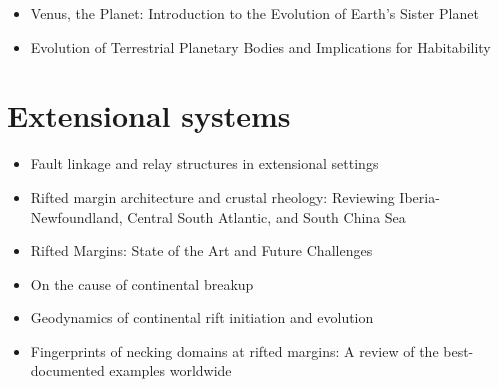    \begin{itemize}
   \item[2023] Venus, the Planet: Introduction to the Evolution of Earth’s Sister Planet \cite{orwb23}
   \item[2025] Evolution of Terrestrial Planetary Bodies and Implications for Habitability \cite{casc25}
   \end{itemize}


\section{Extensional systems}

   \begin{itemize}
   \item [\twothousandsixteen] Fault linkage and relay structures in extensional settings \cite{foro16}
   \item [\twothousandseventeen] Rifted margin architecture and crustal rheology: Reviewing 
                Iberia-Newfoundland, Central South Atlantic, and South China Sea \cite{brhc17}
   \item [\twothousandnineteen] Rifted Margins: State of the Art and Future Challenges \cite{pema19}
   \item [\twothousandtwenty] On the cause of continental breakup \cite{niu20}
   \item [\twothousandtwentythree] Geodynamics of continental rift initiation and evolution \cite{brko23}
   \item [\twothousandtwentyfive] Fingerprints of necking domains at rifted margins: A review of the best-documented examples worldwide \cite{chma25}
   \end{itemize}


